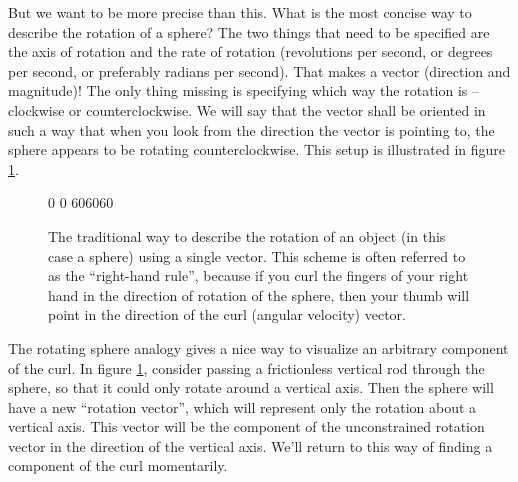 \documentclass{myarticle}
\theoremstyle{nospace}
\newtheorem{old series theorem}{Theorem}
\newenvironment{series theorem}
{\begin{mdframed}\begin{old series theorem}}
    {\end{old series theorem}\end{mdframed}}
\begin{document}
But we want to be more precise than this. What is the most concise way
to describe the rotation of a sphere? The two things that need to be
specified are the axis of rotation and the rate of rotation
(revolutions per second, or degrees per second, or preferably radians
per second). That makes a vector (direction and magnitude)! The only
thing missing is specifying which way the rotation is -- clockwise or
counterclockwise. We will say that the vector shall be oriented in
such a way that when you look from the direction the vector is
pointing to, the sphere appears to be rotating counterclockwise. This
setup is illustrated in figure \ref{fig:curl sphere}.

\begin{figure}[htb!] \centering

  \tdplotsetmaincoords
  {0} %
  {0} %
  \tdplotsetrotatedcoords
  {60}{60}{60}

  \caption{The traditional way to describe the rotation of an object
    (in this case a sphere) using a single vector. This scheme is
    often referred to as the ``right-hand rule'', because if you curl
    the fingers of your right hand in the direction of rotation of the
    sphere, then your thumb will point in the direction of the curl
    (angular velocity) vector.}
  \label{fig:curl sphere}
\end{figure}

The rotating sphere analogy gives a nice way to visualize an arbitrary
component of the curl. In figure \ref{fig:curl sphere}, consider
passing a frictionless vertical rod through the sphere, so that it
could only rotate around a vertical axis. Then the sphere will have a
new ``rotation vector'', which will represent only the rotation about
a vertical axis. This vector will be the component of the
unconstrained rotation vector in the direction of the vertical axis.
We'll return to this way of finding a component of the curl
momentarily.
\end{document}
